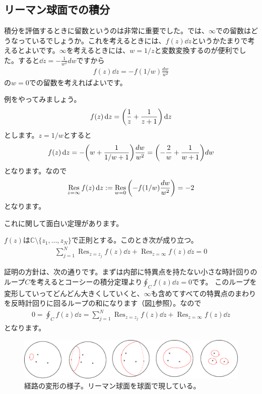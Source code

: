 \documentclass[report,paper=a4, fontsize=12pt, line_length=16cm, number_of_lines=33,dvipdfmx]{jlreq}
\numberwithin{equation}{section}
\newcommand{\Cb}{\mathbb{C}}
\DeclareMathOperator*{\Resi}{\mathrm{Res}}
\begin{document}
\subsection{リーマン球面での積分}

積分を評価するときに留数というのは非常に重要でした。では、$\infty$での留数はどうなっているでしょうか。これを考えるときには、$f(z)\dd{z}$というかたまりで考えるとよいです。$\infty$を考えるときには、$w=1/z$と変数変換するのが便利でした。すると$\dd{z}=-\frac{1}{w^2}dw$ですから
\begin{align}
  f(z)\dd{z}=-f(1/w)\frac{dw}{w^2}
\end{align}
の$w=0$での留数を考えればよいです。

例をやってみましょう。
\begin{align}
  f(z)\dd{z}=\qty(\frac{1}{z}+\frac{1}{z+1})\dd{z}
\end{align}
とします。$z=1/w$とすると
\begin{align}
  f(z)\dd{z}=-\qty(w+\frac{1}{1/w+1})\frac{dw}{w^2}
  =\qty(-\frac{2}{w}+\frac{1}{w+1})dw
\end{align}
となります。なので
\begin{align}
  \Resi_{z=\infty}f(z)\dd{z}:=\Resi_{w=0}\qty(-f(1/w)\frac{dw}{w^2})=-2
\end{align}
となります。

これに関して面白い定理があります。
\begin{theor}{}{}
  $f(z)$は$\Cb\setminus\{z_1,\dots,z_N\}$で正則とする。このとき次が成り立つ。
  \begin{align}
    \sum_{j=1}^{N}\Resi_{z=z_j}f(z)\dd{z}+\Resi_{z=\infty}f(z)\dd{z}=0
  \end{align}
\end{theor}
証明の方針は、次の通りです。まずは内部に特異点を持たない小さな時計回りのループ$C$を考えるとコーシーの積分定理より$\oint_{C}f(z)\dd{z}=0$です。
このループを変形していってどんどん大きくしていくと、$\infty$も含めてすべての特異点のまわりを反時計回りに回るループの和になります（図\ref{fig:residuetheorem}参照）。なので
\begin{align}
  0=\oint_{C}f(z)\dd{z}=\sum_{j=1}^{N}\Resi_{z=z_j}f(z)\dd{z}+\Resi_{z=\infty}f(z)\dd{z}
\end{align}
となります。
\begin{figure}[htbp]
  \centering
  \includegraphics[width=14cm]{residuetheorem.pdf}
  \caption{経路の変形の様子。リーマン球面を球面で現している。}
  \label{fig:residuetheorem}
\end{figure}
\end{document}
